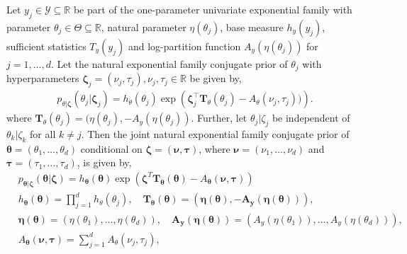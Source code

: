 \begin{proposition}
\label{prop:expfam_form_independent_parameters}
    Let $y_j \in \mathcal{Y} \subseteq \mathbb{R}$ be part of the one-parameter univariate exponential family with parameter $\theta_j \in \Theta \subseteq \mathbb{R}$, natural parameter $\eta(\theta_j)$, base measure $h_{y}(y_j)$, sufficient statistics $T_{y}(y_j)$ and log-partition function $A_y(\eta(\theta_j))$ for $j = 1, \ldots, d$. 
    Let the natural exponential family conjugate prior of $\theta_j$ with hyperparameters $\boldsymbol{\zeta}_j = (\nu_j, \tau_j), \nu_j, \tau_j \in \mathbb{R}$ be given by, 
    \begin{align*} 
        p_{{\theta}|\boldsymbol{\zeta}}({\theta}_j|\boldsymbol{\zeta}_j) = h_{{\theta}}(\theta_j) \exp \left(\boldsymbol{\zeta}_j^\top \mathbf{T}_{\theta}(\theta_j) - A_{{\theta}}({\nu}_j,  {\tau}_j)) \right).
    \end{align*}
    where $ \mathbf{T}_{\theta}(\theta_j)= ({\eta}({\theta}_j), -{A}_{{y}}({\eta}({\theta}_j))$.
    Further, let $\theta_j|\zeta_j$ be independent of $\theta_k|\zeta_k$ for all $k \neq j$. Then the joint natural exponential family conjugate prior of $\boldsymbol{\theta}= (\theta_1, \ldots, \theta_d)$ conditional on $\boldsymbol{\zeta} = (\boldsymbol{\nu}, \boldsymbol{\tau})$, where $\boldsymbol{\nu} = (\nu_1, \ldots,\nu_d)$ and $\boldsymbol{\tau} = (\tau_1, \ldots,\tau_d)$, is given by, 
    \begin{equation*}
        \begin{aligned}
        &p_{\boldsymbol{\theta}|\boldsymbol{\zeta}}(\boldsymbol{\theta}|\boldsymbol{\zeta}) = h_{\boldsymbol{\theta}}(\boldsymbol{\theta}) \exp \left(
        \boldsymbol{\zeta}^T \mathbf{T}_{\boldsymbol{\theta}}(\boldsymbol{\theta}) - A_{\boldsymbol{\theta}}(\boldsymbol{\nu},  \boldsymbol{\tau})  \right) \\
        &h_{\boldsymbol{\theta}}(\boldsymbol{\theta}) = \prod_{j = 1}^d h_{{\theta}}({\theta}_j), \quad
        \mathbf{T}_{\boldsymbol{\theta}}(\boldsymbol{\theta}) = (\boldsymbol{\eta}(\boldsymbol{\theta}), -\mathbf{A}_{\boldsymbol{y}}(\boldsymbol{\eta}(\boldsymbol{\theta}))), \\
        &\boldsymbol{\eta}(\boldsymbol{\theta}) = (\eta(\theta_1), \dots, \eta(\theta_d)), \quad \mathbf{A}_{\boldsymbol{y}}(\boldsymbol{\eta}(\boldsymbol{\theta}))= (A_y(\eta(\theta_1)), \ldots, A_y(\eta(\theta_d))), \\
        &A_{\boldsymbol{\theta}}(\boldsymbol{\nu},  \boldsymbol{\tau}) = \sum_{j = 1}^d A_{{\theta}}({\nu}_j,  {\tau}_j),
            \end{aligned}
    \end{equation*} 
\end{proposition}
